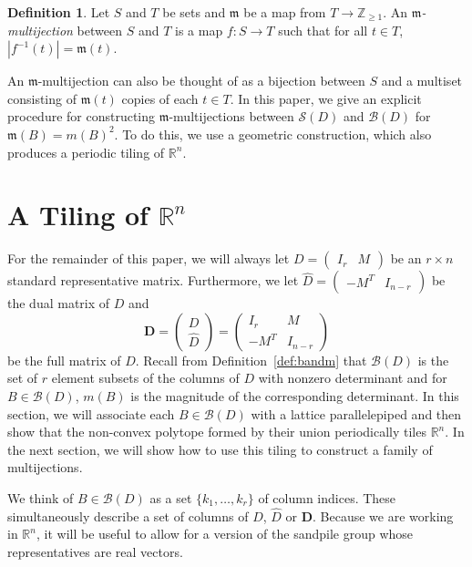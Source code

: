 \documentclass[10pt,a4paper]{amsart}
\theoremstyle{definition}
\newtheorem{defi}[theorem]{Definition}
\newcommand{\R}{\mathbb{R}}
\newcommand{\Z}{\mathbb{Z}}
\newcommand{\D}{\mathbf{D}}
\newcommand{\B}{\mathcal{B}}
\newcommand{\Sand}{\mathcal{S}}
\newcommand{\what}{\widehat}
\newcommand{\indB}[1]{k_{#1}}
\begin{document}
\setcounter{theorem}{14}
\begin{defi}
Let $S$ and $T$ be sets and $\mathfrak m$ be a map from $T \to \Z_{\ge 1}$. An \emph{$\mathfrak m$-multijection} between $S$ and $T$ is a map $f:S \to T$ such that for all $t \in T$, $|f^{-1}(t)| = \mathfrak m(t)$. \end{defi}

An $\mathfrak m$-multijection can also be thought of as a bijection between $S$ and a multiset consisting of $\mathfrak m(t)$ copies of each $t \in T$. In this paper, we give an explicit procedure for constructing $\mathfrak m$-multijections between $\Sand(D)$ and $\B(D)$ for $\mathfrak m(B) = m(B)^2$. To do this, we use a geometric construction, which also produces a periodic tiling of $\R^n$. 

\setcounter{section}{4}
\section{A Tiling of \texorpdfstring{$\R^n$}{Rn}}\label{sec:tiling}

For the remainder of this paper, we will always let $D = \begin{pmatrix} I_r &M \end{pmatrix}$ be an $r \times n$ standard representative matrix. Furthermore, we let $\widehat D = \begin{pmatrix} -M^T & I_{n-r} \end{pmatrix}$ be the dual matrix of $D$ and 
\[
\D = \begin{pmatrix} D \\ \what D \end{pmatrix} = \begin{pmatrix} I_r & M\\ -M^T & I_{n-r}\end{pmatrix}
\]
be the full matrix of $D$. Recall from Definition~\ref{def:bandm} that $\B(D)$ is the set of $r$ element subsets of the columns of $D$ with nonzero determinant and for $B \in \B(D)$, $m(B)$ is the magnitude of the corresponding determinant. In this section, we will associate each $B \in \B(D)$ with a lattice parallelepiped and then show that the non-convex polytope formed by their union periodically tiles $\R^n$. In the next section, we will show how to use this tiling to construct a family of multijections. 

We think of $B \in \B(D)$ as a set $\{\indB 1,\dots, \indB r\}$ of column indices. These simultaneously describe a set of columns of $D$, $\widehat D$ or $\D$. Because we are working in $\R^n$, it will be useful to allow for a version of the sandpile group whose representatives are real vectors. 
\end{document}
